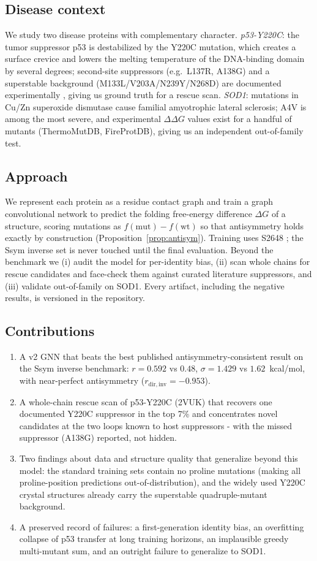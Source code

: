 \documentclass[11pt]{article}
\begin{document}
\subsection{Disease context}
We study two disease proteins with complementary character.
\emph{p53-Y220C}: the tumor suppressor p53 is destabilized by the
Y220C mutation, which creates a surface crevice and lowers the melting
temperature of the DNA-binding domain by several degrees; second-site
suppressors (e.g.\ L137R, A138G) and a superstable background
(M133L/V203A/N239Y/N268D) are documented experimentally
\cite{joerger2006}, giving us ground truth for a rescue scan.
\emph{SOD1}: mutations in Cu/Zn superoxide dismutase cause familial
amyotrophic lateral sclerosis; A4V is among the most severe, and
experimental $\Delta\Delta G$ values exist for a handful of mutants
(ThermoMutDB, FireProtDB), giving us an independent out-of-family test.

\subsection{Approach}
We represent each protein as a residue contact graph and train a graph
convolutional network to predict the folding free-energy difference
$\Delta G$ of a structure, scoring mutations as
$f(\mathrm{mut})-f(\mathrm{wt})$ so that antisymmetry holds exactly by
construction (Proposition~\ref{prop:antisym}). Training uses S2648
\cite{pucci2018}; the Ssym inverse set is never touched until the final
evaluation. Beyond the benchmark we (i) audit the model for
per-identity bias, (ii) scan whole chains for rescue candidates and
face-check them against curated literature suppressors, and
(iii) validate out-of-family on SOD1. Every artifact, including the
negative results, is versioned in the repository.

\subsection{Contributions}
\begin{enumerate}
\item A v2 GNN that beats the best published antisymmetry-consistent
result on the Ssym inverse benchmark: $r=0.592$ vs $0.48$,
$\sigma=1.429$ vs $1.62$~kcal/mol, with near-perfect antisymmetry
($r_{\mathrm{dir,inv}}=-0.953$).
\item A whole-chain rescue scan of p53-Y220C (2VUK) that recovers one
documented Y220C suppressor in the top 7\% and concentrates novel
candidates at the two loops known to host suppressors - with the missed
suppressor (A138G) reported, not hidden.
\item Two findings about data and structure quality that generalize
beyond this model: the standard training sets contain no proline
mutations (making all proline-position predictions
out-of-distribution), and the widely used Y220C crystal structures
already carry the superstable quadruple-mutant background.
\item A preserved record of failures: a first-generation identity bias,
an overfitting collapse of p53 transfer at long training horizons, an
implausible greedy multi-mutant sum, and an outright failure to
generalize to SOD1.
\end{enumerate}
\end{document}
